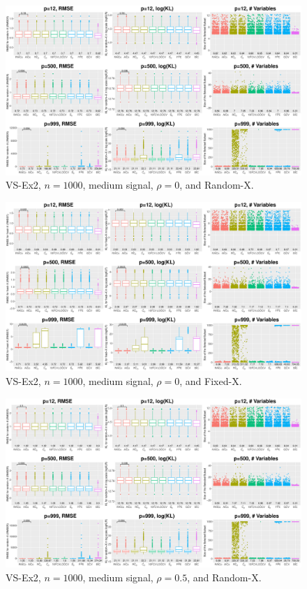 \clearpage
\begin{figure}[!ht]
\centering
\includegraphics[width=\textwidth]{figures/supplement/randomx_VS-Ex2_n1000_msnr_rho0.eps}
\caption{VS-Ex2, $n=1000$, medium signal, $\rho=0$, and Random-X.}
\end{figure}
\begin{figure}[!ht]
\centering
\includegraphics[width=\textwidth]{figures/supplement/fixedx_VS-Ex2_n1000_msnr_rho0.eps}
\caption{VS-Ex2, $n=1000$, medium signal, $\rho=0$, and Fixed-X.}
\end{figure}
\clearpage
\begin{figure}[!ht]
\centering
\includegraphics[width=\textwidth]{figures/supplement/randomx_VS-Ex2_n1000_msnr_rho05.eps}
\caption{VS-Ex2, $n=1000$, medium signal, $\rho=0.5$, and Random-X.}
\end{figure}
